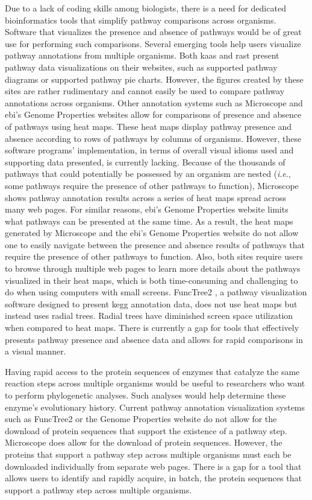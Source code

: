Due to a lack of coding skills among biologists, there is a need for dedicated 
bioinformatics tools that simplify pathway comparisons across organisms. 
Software that visualizes the presence and absence of pathways would be of great 
use for performing such comparisons. Several emerging tools help users visualize 
pathway annotations from multiple organisms. Both \gls{kaas} and \gls{rast} 
present pathway data visualizations on their websites, such as supported pathway 
diagrams or supported pathway pie charts. However, the figures created by these 
sites are rather rudimentary and cannot easily be used to compare pathway 
annotations across organisms. Other annotation systems such as Microscope 
\cite{vallenet2016microscope} and \gls{ebi}'s Genome Properties websites allow 
for comparisons of presence and absence of pathways using heat maps. These heat 
maps display pathway presence and absence according to rows of pathways by 
columns of organisms. However, these software programs' implementation, in terms 
of overall visual idioms used and supporting data presented, is currently 
lacking. Because of the thousands of pathways that could potentially be 
possessed by an organism are nested (\textit{i}.\textit{e}., some pathways 
require the presence of other pathways to function), Microscope 
\cite{vallenet2016microscope} shows pathway annotation results across a series 
of heat maps spread across many web pages. For similar reasons, \gls{ebi}'s 
Genome Properties website limits what pathways can be presented at the same 
time. As a result, the heat maps generated by Microscope and the \gls{ebi}'s 
Genome Properties website do not allow one to easily navigate between the 
presence and absence results of pathways that require the presence of other 
pathways to function. Also, both sites require users to browse through multiple 
web pages to learn more details about the pathways visualized in their heat 
maps, which is both time-consuming and challenging to do when using computers 
with small screens. FuncTree2 \cite{darzi2019functree2}, a pathway visualization 
software designed to present \gls{kegg} annotation data, does not use heat maps 
but instead uses radial trees. Radial trees have diminished screen space 
utilization when compared to heat maps. There is currently a gap for tools that 
effectively presents pathway presence and absence data and allows for rapid 
comparisons in a visual manner. 

Having rapid access to the protein sequences of enzymes that catalyze the same 
reaction steps across multiple organisms would be useful to researchers who want 
to perform phylogenetic analyses. Such analyses would help determine these 
enzyme's evolutionary history. Current pathway annotation visualization systems 
such as FuncTree2 or the Genome Properties website do not allow for the download 
of protein sequences that support the existence of a pathway step. Microscope 
does allow for the download of protein sequences. However, the proteins that 
support a pathway step across multiple organisms must each be downloaded 
individually from separate web pages. There is a gap for a tool that allows 
users to identify and rapidly acquire, in batch, the protein sequences that 
support a pathway step across multiple organisms.

